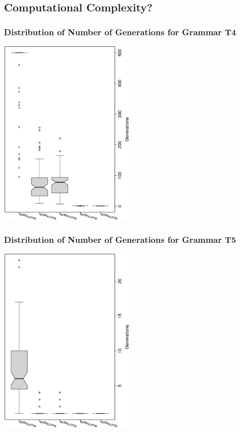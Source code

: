 \documentclass[18pt,c]{beamer}
\begin{document}
\subsection{Computational Complexity?}
 \begin{frame}
 \frametitle{ Distribution of Number of Generations for Grammar T4 }
 \begin{center}
\includegraphics[width=0.5\textwidth, angle=-90]
{ExpEboxplottGenerations005.eps}
 \end{center}
 \label{ExpEboxplottGenerations005.eps}  
 \end{frame}

 \begin{frame}
 \frametitle{ Distribution of Number of Generations for Grammar T5 }
 \begin{center}
\includegraphics[width=0.5\textwidth, angle=-90]
{ExpEboxplottGenerations006.eps}
 \end{center}
 \label{ExpEboxplottGenerations006.eps}  
 \end{frame}
\end{document}

